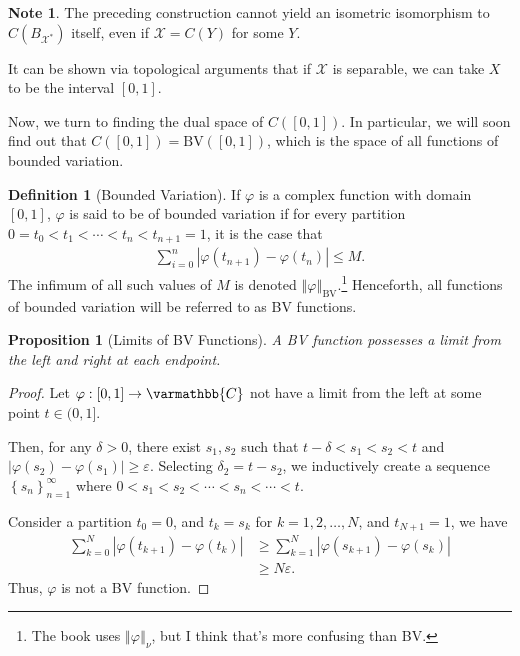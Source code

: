 \documentclass[10pt]{extarticle}
\newcommand{\C}{\mathbb{C}}
\newcommand{\norm}[1]{\left\Vert #1\right\Vert}
\newcommand{\set}[1]{\left\{#1\right\}}
\newcommand{\ve}{\varepsilon}
\theoremstyle{plain}
\newtheorem*{proposition}{Proposition}
\theoremstyle{definition}
\newtheorem*{definition}{Definition}
\theoremstyle{note}
\newtheorem*{note}{Note}
\renewcommand*{\mathbb}[1]{\varmathbb{#1}}
\renewcommand{\newline}{\hfill\break}
\begin{document}
\begin{note}
  The preceding construction cannot yield an isometric isomorphism to $C\left(B_{\mathcal{X}^{\ast}}\right)$ itself, even if $\mathcal{X} = C(Y)$ for some $Y$.\newline

  It can be shown via topological arguments that if $\mathcal{X}$ is separable, we can take $X$ to be the interval $[0,1]$.
\end{note}
Now, we turn to finding the dual space of $C([0,1])$. In particular, we will soon find out that $C([0,1]) = \text{BV}([0,1])$, which is the space of all functions of bounded variation.
\begin{definition}[Bounded Variation]
  If $\varphi$ is a complex function with domain $[0,1]$, $\varphi$ is said to be of bounded variation if for every partition $0 = t_0 < t_1 < \cdots < t_{n} < t_{n+1} = 1$, it is the case that
  \begin{align*}
    \sum_{i=0}^{n}\left\vert \varphi\left(t_{n+1}\right) - \varphi\left(t_{n}\right) \right\vert \leq M.
  \end{align*}
  The infimum of all such values of $M$ is denoted $\norm{\varphi}_{\text{BV}}$.\footnote{The book uses $\norm{\varphi}_{\nu}$, but I think that's more confusing than BV.} Henceforth, all functions of bounded variation will be referred to as BV functions.
\end{definition}
\begin{proposition}[Limits of BV Functions]
  A BV function possesses a limit from the left and right at each endpoint.
\end{proposition}
\begin{proof}
  Let $\varphi: [0,1]\rightarrow \C$ not have a limit from the left at some point $t\in (0,1]$.\newline

  Then, for any $\delta > 0$, there exist $s_1,s_2$ such that $t-\delta < s_1 < s_2 < t$ and $\left\vert \varphi(s_2) - \varphi(s_1) \right\vert \geq \ve$. Selecting $\delta_2 = t - s_2$, we inductively create a sequence $\set{s_n}_{n = 1}^{\infty}$ where $0 < s_1 < s_2 < \cdots < s_n < \cdots < t$.\newline

  Consider a partition $t_0 = 0$, and $t_k= s_k$ for $k = 1,2,\dots,N $, and $t_{N+1} = 1$, we have
  \begin{align*}
    \sum_{k=0}^{N}\left\vert \varphi(t_{k+1}) - \varphi(t_k) \right\vert &\geq \sum_{k=1}^{N}\left\vert \varphi(s_{k+1}) - \varphi(s_{k}) \right\vert\\
                                                                         &\geq N\varepsilon.
  \end{align*}
  Thus, $\varphi$ is not a BV function.
\end{proof}
\end{document}
